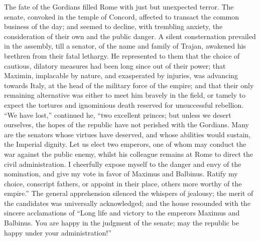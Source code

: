 The fate of the Gordians filled Rome with just but unexpected
terror. The senate, convoked in the temple of Concord, affected
to transact the common business of the day; and seemed to
decline, with trembling anxiety, the consideration of their own
and the public danger. A silent consternation prevailed in the
assembly, till a senator, of the name and family of Trajan,
awakened his brethren from their fatal lethargy. He represented
to them that the choice of cautious, dilatory measures had been
long since out of their power; that Maximin, implacable by
nature, and exasperated by injuries, was advancing towards Italy,
at the head of the military force of the empire; and that their
only remaining alternative was either to meet him bravely in the
field, or tamely to expect the tortures and ignominious death
reserved for unsuccessful rebellion. “We have lost,” continued
he, “two excellent princes; but unless we desert ourselves, the
hopes of the republic have not perished with the Gordians. Many
are the senators whose virtues have deserved, and whose abilities
would sustain, the Imperial dignity. Let us elect two emperors,
one of whom may conduct the war against the public enemy, whilst
his colleague remains at Rome to direct the civil administration.
I cheerfully expose myself to the danger and envy of the
nomination, and give my vote in favor of Maximus and Balbinus.
Ratify my choice, conscript fathers, or appoint in their place,
others more worthy of the empire.” The general apprehension
silenced the whispers of jealousy; the merit of the candidates
was universally acknowledged; and the house resounded with the
sincere acclamations of “Long life and victory to the emperors
Maximus and Balbinus. You are happy in the judgment of the
senate; may the republic be happy under your administration!”\footnotemark[27]


